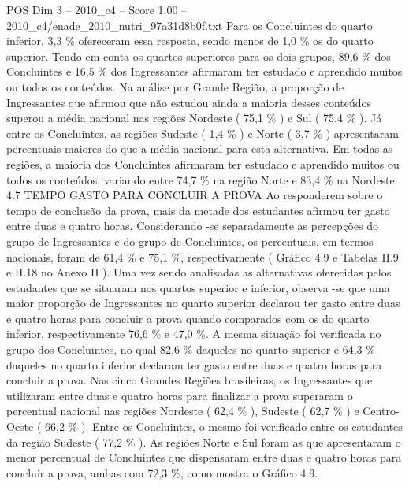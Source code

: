 \begin{textsample}{POS Dim 3 – 2010\_c4 – Score 1.00 – 2010\_c4/enade\_2010\_nutri\_97a31d8b0f.txt}
Para os Concluintes do quarto inferior, 3,3 \% ofereceram essa resposta, sendo menos de 1,0 \% os do quarto superior.
Tendo em conta os quartos superiores para os dois grupos, 89,6 \% dos Concluintes e 16,5 \% dos Ingressantes afirmaram ter estudado e aprendido muitos ou todos os conteúdos.
Na análise por Grande Região, a proporção de Ingressantes que afirmou que não estudou ainda a maioria desses conteúdos superou a média nacional nas regiões Nordeste ( 75,1 \% ) e Sul ( 75,4 \% ).
Já entre os Concluintes, as regiões Sudeste ( 1,4 \% ) e Norte ( 3,7 \% ) apresentaram percentuais maiores do que a média nacional para esta alternativa.
Em todas as regiões, a maioria dos Concluintes afirmaram ter estudado e aprendido muitos ou todos os conteúdos, variando entre 74,7 \% na região Norte e 83,4 \% na Nordeste. 4.7 TEMPO GASTO PARA CONCLUIR A PROVA Ao responderem sobre o tempo de conclusão da prova, mais da metade dos estudantes afirmou ter gasto entre duas e quatro horas.
Considerando -se separadamente as percepções do grupo de Ingressantes e do grupo de Concluintes, os percentuais, em termos nacionais, foram de 61,4 \% e 75,1 \%, respectivamente ( Gráfico 4.9 e Tabelas II.9 e II.18 no Anexo II ).
Uma vez sendo analisadas as alternativas oferecidas pelos estudantes que se situaram nos quartos superior e inferior, observa -se que uma maior proporção de Ingressantes no quarto superior declarou ter gasto entre duas e quatro horas para concluir a prova quando comparados com os do quarto inferior, respectivamente 76,6 \% e 47,0 \%.
A mesma situação foi verificada no grupo dos Concluintes, no qual 82,6 \% daqueles no quarto superior e 64,3 \% daqueles no quarto inferior declaram ter gasto entre duas e quatro horas para concluir a prova.
Nas cinco Grandes Regiões brasileiras, os Ingressantes que utilizaram entre duas e quatro horas para finalizar a prova superaram o percentual nacional nas regiões Nordeste ( 62,4 \% ), Sudeste ( 62,7 \% ) e Centro-Oeste ( 66,2 \% ).
Entre os Concluintes, o mesmo foi verificado entre os estudantes da região Sudeste ( 77,2 \% ).
As regiões Norte e Sul foram as que apresentaram o menor percentual de Concluintes que dispensaram entre duas e quatro horas para concluir a prova, ambas com 72,3 \%, como mostra o Gráfico 4.9.

\end{textsample}
